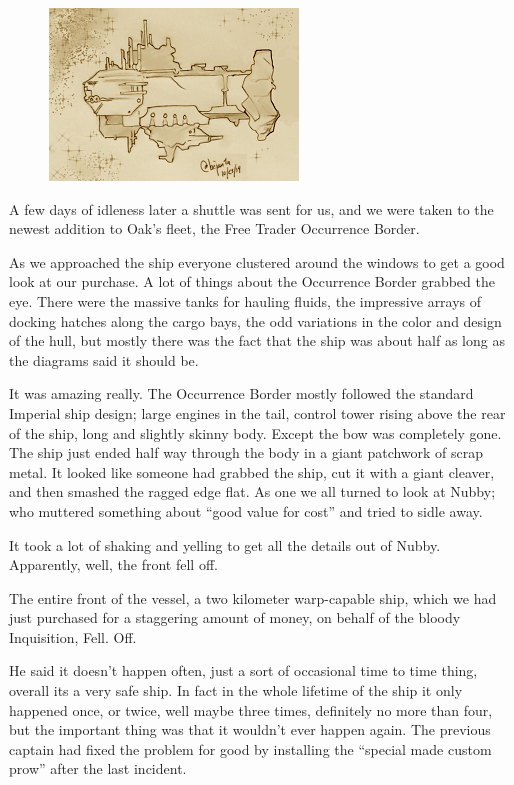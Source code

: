\begin{figure}
	\begin{center}
		\includegraphics[width=\figwidth]{pics/7/9.png}
	\end{center}
\end{figure}
A few days of idleness later a shuttle was sent for us, and we were taken to the newest addition to Oak’s fleet, the Free Trader Occurrence Border.

As we approached the ship everyone clustered around the windows to get a good look at our purchase. 
A lot of things about the Occurrence Border grabbed the eye. 
There were the massive tanks for hauling fluids, the impressive arrays of docking hatches along the cargo bays, the odd variations in the color and design of the hull, but mostly there was the fact that the ship was about half as long as the diagrams said it should be.

It was amazing really. 
The Occurrence Border mostly followed the standard Imperial ship design; 
large engines in the tail, control tower rising above the rear of the ship, long and slightly skinny body. 
Except the bow was completely gone. 
The ship just ended half way through the body in a giant patchwork of scrap metal. 
It looked like someone had grabbed the ship, cut it with a giant cleaver, and then smashed the ragged edge flat. 
As one we all turned to look at Nubby; 
who muttered something about “good value for cost” and tried to sidle away.

It took a lot of shaking and yelling to get all the details out of Nubby. 
Apparently, well, the front fell off. 


The entire front of the vessel, a two kilometer warp-capable ship, which we had just purchased for a staggering amount of money, on behalf of the bloody Inquisition, Fell. 
Off.

He said it doesn’t happen often, just a sort of occasional time to time thing, overall its a very safe ship. 
In fact in the whole lifetime of the ship it only happened once, or twice, well maybe three times, definitely no more than four, but the important thing was that it wouldn’t ever happen again. 
The previous captain had fixed the problem for good by installing the “special made custom prow” after the last incident.

